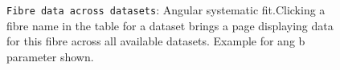 \documentclass[12pt]{article}
\begin{document}
\begin{figure}
\centering
\noindent{}
  \caption{\centering \texttt{Fibre data across datasets}: Angular systematic fit.\hspace{\textwidth}Clicking a fibre name in the table for a dataset brings a page displaying data for this fibre across all available datasets. Example for ang b parameter shown.}
  \label{fig:min9}
\end{figure}
\end{document}
